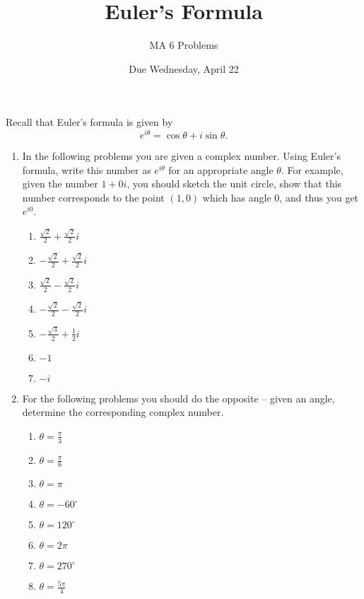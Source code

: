 \documentclass[12pt,letterpaper]{article}
\theoremstyle{definition}
\numberwithin{equation}{section}
\begin{document}
\title{Euler's Formula}
\author{MA 6 Problems}
\date{Due Wednesday, April 22}
\maketitle
Recall that Euler's formula is given by
\begin{equation*}
e^{i\theta}=\cos{\theta}+i\sin{\theta}.
\end{equation*}
\begin{enumerate}
\item
In the following problems you are given a complex number. Using Euler's formula, write this number as $e^{i\theta}$ for an appropriate angle $\theta$. For example, given the number $1+0i$, you should sketch the unit circle, show that this number corresponds to the point $(1,0)$ which has angle $0$, and thus you get $e^{i0}$.

\begin{enumerate}
\item
$\frac{\sqrt{2}}{2}+\frac{\sqrt{2}}{2}i$

\item
$-\frac{\sqrt{2}}{2}+\frac{\sqrt{2}}{2}i$

\item
$\frac{\sqrt{2}}{2}-\frac{\sqrt{2}}{2}i$

\item
$-\frac{\sqrt{2}}{2}-\frac{\sqrt{2}}{2}i$

\item
$-\frac{\sqrt{3}}{2}+\frac{1}{2}i$

\item
$-1$

\item
$-i$

\end{enumerate}

\item
For the following problems you should do the opposite -- given an angle, determine the corresponding complex number.

\begin{enumerate}
\item
$\theta=\frac{\pi}{3}$

\item
$\theta=\frac{\pi}{6}$

\item
$\theta=\pi$

\item
$\theta=-60^\circ$

\item
$\theta=120^\circ$

\item
$\theta=2\pi$

\item
$\theta=270^\circ$

\item
$\theta=\frac{5\pi}{4}$

\end{enumerate}
\end{enumerate}
\end{document}
